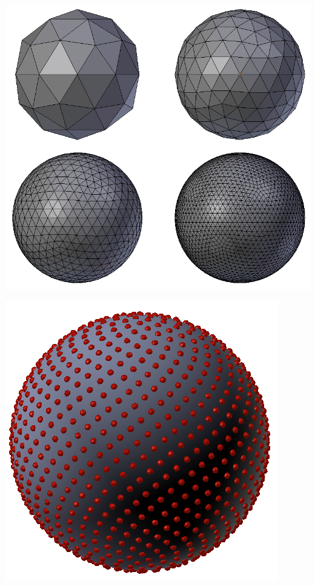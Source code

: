 \begin{figureth}
	\begin{subfigureth}{0.45\textwidth}
		\includegraphics[width=\linewidth]{images/icosphere}
		\caption{\textit{Ico Sphère} de \textit{Blender} subdivisée 2, 3, 4 et 5 fois.}
		\label{icosphere}
	\end{subfigureth}
	\qquad
	\begin{subfigureth}{0.4\textwidth}
		\includegraphics[width=\linewidth]{images/fibonacci}
		\caption[Sphère de Fibonacci]{Sommets d'une sphère de Fibonacci discretisée en 1000 points.}
		\label{fibonacci}
	\end{subfigureth}
	\caption{Sphères permettant l'émission omnidirectionnelle de rayons.}
\end{figureth}


